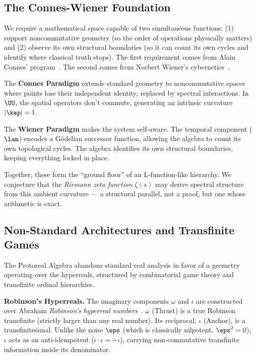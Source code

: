 \subsection{The Connes-Wiener Foundation}\label{sec:connes-wiener}

We require a mathematical space capable of two simultaneous functions: (1) support noncommutative geometry (so the order of operations physically matters) and (2) observe its own structural boundaries (so it can count its own cycles and identify where classical truth stops). The first requirement comes from Alain Connes' program~\cite{connes}. The second comes from Norbert Wiener's cybernetics~\cite{wiener}.

The \textbf{Connes Paradigm} extends standard geometry to noncommutative spaces where points lose their independent identity, replaced by spectral interactions. In $\UU$, the spatial operators don't commute, generating an intrinsic curvature $|\kap| = 1$.

The \textbf{Wiener Paradigm} makes the system self-aware. The temporal component ($\lam$) encodes a G\"odelian successor function, allowing the algebra to count its own topological cycles. The algebra identifies its own structural boundaries, keeping everything locked in place.

Together, these form the ``ground floor'' of an L-function-like hierarchy. We conjecture that the \emph{Riemann zeta function} $\zeta(s)$ may derive spectral structure from this ambient curvature --- a structural parallel, not a proof, but one whose arithmetic is exact.

\subsection{Non-Standard Architectures and Transfinite Games}

The Protoreal Algebra abandons standard real analysis in favor of a geometry operating over the hyperreals, structured by combinatorial game theory and transfinite ordinal hierarchies.

\textbf{Robinson's Hyperreals.} The imaginary components $\omega$ and $\iota$ are constructed over Abraham \emph{Robinson's hyperreal numbers}~\cite{robinson}. $\omega$ (Thrust) is a true Robinson transfinite (strictly larger than any real number). Its reciprocal, $\iota$ (Anchor), is a transfinitesimal. Unlike the noise $\eps$ (which is classically nilpotent, $\eps^2 = 0$), $\iota$ acts as an anti-idempotent ($\iota \cdot \iota = -\iota$), carrying non-commutative transfinite information inside its denominator.

